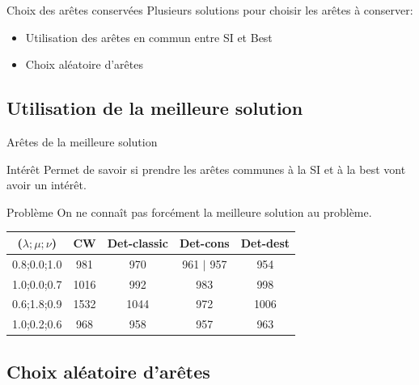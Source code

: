 \documentclass{beamer}
\begin{document}
\begin{frame}{Choix des arêtes conservées}
Plusieurs solutions pour choisir les arêtes à conserver:
\begin{itemize}
\item Utilisation des arêtes en commun entre SI et Best
\item Choix aléatoire d'arêtes
\end{itemize}
\end{frame}

\subsection{Utilisation de la meilleure solution}
\begin{frame}{Arêtes de la meilleure solution}
\begin{block}{Intérêt}
Permet de savoir si prendre les arêtes communes à la SI et à la best vont avoir un intérêt.
\end{block}
\begin{alertblock}{Problème}
On ne connaît pas forcément la meilleure solution au problème. 
\end{alertblock}


\begin{tabular}{|c|c|c|c|c|}
   \hline
   ($\lambda;\mu;\nu$) & CW & Det-classic & Det-cons & Det-dest \\
   \hline
   0.8;0.0;1.0 & 981 & 970 & 961 $|$ 957 & 954 \\
   \hline
   1.0;0.0;0.7 & 1016 & 992 & 983 & 998 \\
   \hline
   0.6;1.8;0.9 & 1532 & 1044 & 972 & 1006\\
   \hline
   1.0;0.2;0.6 & 968 & 958 & 957 & 963 \\
   \hline
\end{tabular}
\end{frame}
\subsection{Choix aléatoire d'arêtes}
\end{document}

